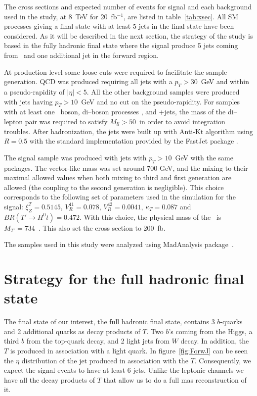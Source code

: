 The cross sections and expected number of events for signal and each background used in the study, at 8~TeV for 20~fb$^{-1}$, are listed in table~\ref{tab:xsec}. All SM processes giving a final state with at least 5 jets in the final state have been considered. As it will be described in the next section, the strategy of the study is based in the fully hadronic final state where the signal produce 5 jets coming from \Tp~and one additional jet in the forward region.

At production level some loose cuts were required to facilitate the sample generation. QCD was produced requiring all jets with a $p_{T}>30$~GeV and within a pseudo-rapidity of $|\eta|<5$. All the other background samples were produced with jets having $p_{T}>10$~GeV and no cut on the pseudo-rapidity. For samples with at least one \Z~boson, di--boson processes \Z\Z, \W\Z and \Z+jets, the mass of the di--lepton pair was required to satisfy $M_{ll}>50$~\GeVcc in order to avoid integration troubles. After hadronization, the jets were built up with Anti-Kt algorithm using $R=0.5$ with the standard implementation provided by the FastJet package \cite{Cacciari:2011ma}.

The signal sample was produced with jets with $p_{T}>10$~GeV with the same packages. The vector-like mass was set around 700 GeV, and the mixing to their maximal allowed values when both mixing to third and first generation are allowed (the coupling to the second generation is negligible). This choice corresponds to the following set of parameters used in the simulation for the signal: $\xi_Z^{T}=0.5145$, $V_{R}^{41}=0.078$, $V_{R}^{42}=0.0041$, $\kappa_{T}=0.087$ and $BR(T' \to H^{0} t)=0.472$. With this choice, the physical mass of the \Tp~is $M_{T'}=734$~\GeVcc. This also set the cross section to 200~fb.

The samples used in this study were analyzed using MadAnalysis package~\cite{Conte:2012fm, Conte:2014zja}.

\section{Strategy for the full hadronic final state}
\label{sec:Pstra}

The final state of our interest, the full hadronic final state, contains 3 $b$-quarks and 2 additional quarks as decay products of $T$. Two $b$'s coming from the Higgs, a third $b$ from the top-quark decay, and 2 light jets from $W$ decay. In addition, the $T$ is produced in association with a light quark. In figure~\ref{fig:ForwJ} can be seen the $\eta$ distribution of the jet produced in association with the $T$. Consequently, we expect the signal events to have at least 6 jets. Unlike the leptonic channels we have all the decay products of $T$ that allow us to do a full mas reconstruction of it.

